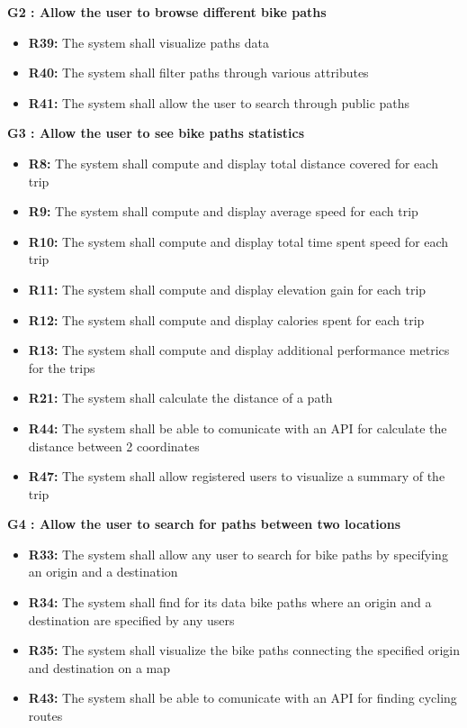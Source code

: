 \textbf{G2 : Allow the user to browse different bike paths}
\begin{itemize}
    \item \textbf{R39:} The system shall visualize paths data
    \item \textbf{R40:} The system shall filter paths through various attributes
    \item \textbf{R41:} The system shall allow the user to search through public paths
\end{itemize}
\vspace{1cm}

\textbf{G3 : Allow the user to see bike paths statistics}
\begin{itemize}
    \item \textbf{R8:} The system shall compute and display total distance covered for each trip
    \item \textbf{R9:} The system shall compute and display average speed for each trip
    \item \textbf{R10:} The system shall compute and display total time spent speed for each trip
    \item \textbf{R11:} The system shall compute and display elevation gain for each trip
    \item \textbf{R12:} The system shall compute and display calories spent for each trip
    \item \textbf{R13:} The system shall compute and display additional performance metrics for the trips
    \item \textbf{R21:} The system shall calculate the distance of a path
    \item \textbf{R44:} The system shall be able to comunicate with an API for calculate the distance between 2 coordinates
    \item \textbf{R47:} The system shall allow registered users to visualize a summary of the trip
\end{itemize}
\vspace{1cm}

\textbf{G4 : Allow the user to search for paths between two locations}
\begin{itemize}
    \item \textbf{R33:} The system shall allow any user to search for bike paths by specifying an origin and a destination
    \item \textbf{R34:} The system shall find for its data bike paths where an origin and a destination are specified by any users
    \item \textbf{R35:} The system shall visualize the bike paths connecting the specified origin and destination on a map
    \item \textbf{R43:} The system shall be able to comunicate with an API for finding cycling routes
\end{itemize}
\vspace{1cm}

